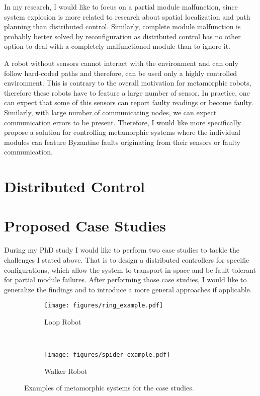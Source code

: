 In my research, I would like to focus on a partial module malfunction, since
system explosion is more related to research about spatial localization and path
planning than distributed control. Similarly, complete module malfunction is
probably better solved by reconfiguration as distributed control has no other
option to deal with a completely malfunctioned module than to ignore it.

A robot without sensors cannot interact with the environment and can only follow
hard-coded paths and therefore, can be used only a highly controlled
environment. This is contrary to the overall motivation for metamorphic robots,
therefore these robots have to feature a large number of sensor. In practice,
one can expect that some of this sensors can report faulty readings or become
faulty. Similarly, with large number of communicating nodes, we can expect
communication errors to be present. Therefore, I would like more specifically
propose a solution for controlling metamorphic systems where the individual
modules can feature Byzantine faults originating from their sensors or faulty
communication.

\section{Distributed Control}


\section{Proposed Case Studies}

During my PhD study I would like to perform two case studies to tackle the
challenges I stated above. That is to design a distributed controllers for
specific configurations, which allow the system to transport in space and be
fault tolerant for partial module failures. After performing those case
studies, I would like to generalize the findings and to introduce a more general
approaches if applicable.

\begin{figure}[!t]
    \centering
    \begin{subfigure}[b]{0.45\textwidth}
        \texttt{[image: figures/ring\_example.pdf]}
        \caption{Loop Robot}
        \label{fig:example_roller}
    \end{subfigure}
    ~
    \begin{subfigure}[b]{0.45\textwidth}
        \texttt{[image: figures/spider\_example.pdf]}
        \caption{Walker Robot}
        \label{fig:example_spider}
    \end{subfigure}

    \caption{Examples of metamorphic systems for the case studies.}
\end{figure}

